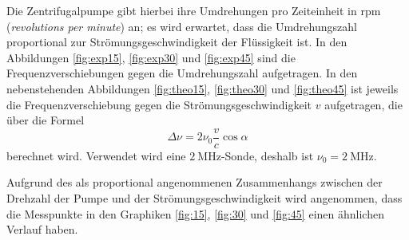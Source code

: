 Die Zentrifugalpumpe gibt hierbei ihre Umdrehungen pro Zeiteinheit in $\mathrm{rpm}$ (\textit{revolutions per minute}) an; es wird erwartet, dass die Umdrehungszahl 
proportional zur Strömungsgeschwindigkeit der Flüssigkeit ist. 
In den Abbildungen \ref{fig:exp15}, \ref{fig:exp30} und \ref{fig:exp45} sind die Frequenzverschiebungen gegen die Umdrehungszahl aufgetragen. 
In den nebenstehenden Abbildungen \ref{fig:theo15}, \ref{fig:theo30} und \ref{fig:theo45} ist jeweils die Frequenzverschiebung 
gegen die Strömungsgeschwindigkeit $v$ aufgetragen, die über die Formel 
\begin{equation*}
    \Delta \nu=2 \nu_0 \frac{v}{c} \cos \alpha
\end{equation*}
berechnet wird. Verwendet wird eine $\SI{2}{\mega\hertz}$-Sonde, deshalb ist $\nu_0=\SI{2}{\mega\hertz}$. 

Aufgrund des als proportional angenommenen Zusammenhangs zwischen der Drehzahl der Pumpe und der Strömungsgeschwindigkeit 
wird angenommen, dass die Messpunkte in den Graphiken \ref{fig:15}, \ref{fig:30} und \ref{fig:45} einen ähnlichen Verlauf haben. 

